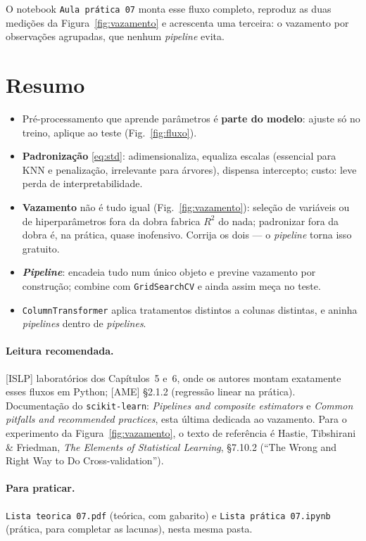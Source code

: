 \documentclass[11pt,a4paper]{article}
\begin{document}
O notebook \texttt{Aula prática 07} monta esse fluxo completo, reproduz as duas
medições da Figura~\ref{fig:vazamento} e acrescenta uma terceira: o vazamento por
observações agrupadas, que nenhum \emph{pipeline} evita.

\section*{Resumo}
\begin{itemize}[leftmargin=1.4cm]
  \item Pré-processamento que aprende parâmetros é \textbf{parte do modelo}: ajuste
        só no treino, aplique ao teste (Fig.~\ref{fig:fluxo}).
  \item \textbf{Padronização} \eqref{eq:std}: adimensionaliza, equaliza escalas
        (essencial para KNN e penalização, irrelevante para árvores), dispensa
        intercepto; custo: leve perda de interpretabilidade.
  \item \textbf{Vazamento} não é tudo igual (Fig.~\ref{fig:vazamento}): seleção de
        variáveis ou de hiperparâmetros fora da dobra fabrica $R^2$ do nada;
        padronizar fora da dobra é, na prática, quase inofensivo. Corrija os dois
        --- o \emph{pipeline} torna isso gratuito.
  \item \textbf{\emph{Pipeline}}: encadeia tudo num único objeto e previne
        vazamento por construção; combine com \texttt{GridSearchCV} e ainda assim
        meça no teste.
  \item \texttt{ColumnTransformer} aplica tratamentos distintos a colunas distintas,
        e aninha \emph{pipelines} dentro de \emph{pipelines}.
\end{itemize}

\paragraph{Leitura recomendada.} [ISLP] laboratórios dos Capítulos~5 e~6, onde os
autores montam exatamente esses fluxos em Python; [AME] §2.1.2 (regressão linear na
prática). Documentação do \texttt{scikit-learn}: \emph{Pipelines and composite
estimators} e \emph{Common pitfalls and recommended practices}, esta última dedicada
ao vazamento. Para o experimento da Figura~\ref{fig:vazamento}, o texto de
referência é Hastie, Tibshirani \& Friedman, \emph{The Elements of Statistical
Learning}, §7.10.2 (``The Wrong and Right Way to Do Cross-validation'').

\paragraph{Para praticar.} \texttt{Lista teorica 07.pdf} (teórica, com gabarito) e \texttt{Lista prática 07.ipynb} (prática, para completar as lacunas), nesta mesma pasta.
\end{document}
